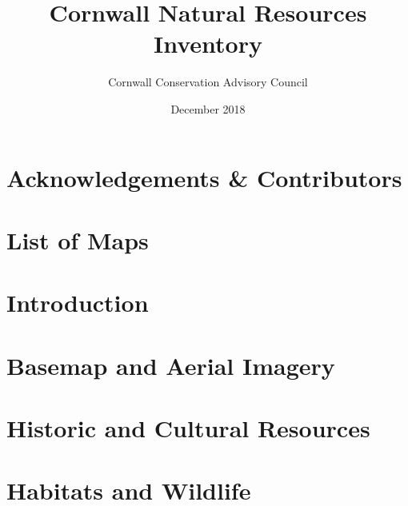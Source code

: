 \documentclass[11pt]{article}
\title{Cornwall Natural Resources Inventory}
\author{Cornwall Conservation Advisory Council}
\date{December 2018} %
\begin{document}
\begin{titlepage}
\maketitle
\end{titlepage}

\linespread{1.15} %

\section{Acknowledgements \& Contributors}\label{sec:acknowledgements}


\pagebreak

\tableofcontents

\pagebreak
\section{List of Maps}\label{sec:listofmaps}


\pagebreak

\label{sec:executivesummary}

\section{Introduction}\label{sec:intro}


\pagebreak
\section{Basemap and Aerial Imagery}\label{sec:basemap}


\section{Historic and Cultural Resources}\label{sec:historic}


\section{Habitats and Wildlife}\label{sec:habitats}

\end{document}
